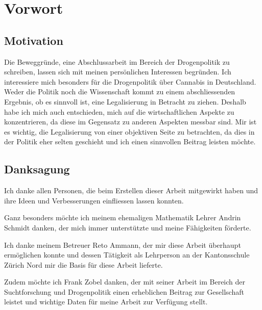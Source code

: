 \documentclass[../main.tex]{subfiles}
\begin{document}
	\section*{Vorwort}	
	
	\subsection*{Motivation}
	Die Beweggründe, eine Abschlussarbeit im Bereich der Drogenpolitik zu schreiben, lassen sich mit meinen persönlichen Interessen begründen.
	Ich interessiere mich besonders für die Drogenpolitik über Cannabis in Deutschland.
	Weder die Politik noch die Wissenschaft kommt zu einem abschliessenden Ergebnis, ob es sinnvoll ist, eine Legalisierung in Betracht zu ziehen.
	Deshalb habe ich mich auch entschieden, mich auf die wirtschaftlichen Aspekte zu konzentrieren, da diese im Gegensatz zu anderen Aspekten messbar sind.
	Mir ist es wichtig, die Legalisierung von einer objektiven Seite zu betrachten, da dies in der Politik eher selten geschieht und ich einen sinnvollen Beitrag leisten möchte. 
	
	
	\subsection*{Danksagung}
	Ich danke allen Personen, die beim Erstellen dieser Arbeit mitgewirkt haben und ihre Ideen und Verbesserungen einfliessen lassen konnten.
	
	\noindent
	Ganz besonders möchte ich meinem ehemaligen Mathematik Lehrer Andrin Schmidt danken, der mich immer unterstützte und meine Fähigkeiten förderte.
	
	\noindent
	Ich danke meinem Betreuer Reto Ammann, der mir diese Arbeit überhaupt ermöglichen konnte und dessen Tätigkeit als Lehrperson an der Kantonsschule Zürich Nord mir die Basis für diese Arbeit lieferte.
	
	\noindent
	Zudem möchte ich Frank Zobel danken, der mit seiner Arbeit im Bereich der Suchtforschung und Drogenpolitik einen erheblichen Beitrag zur Gesellschaft leistet und wichtige Daten für meine Arbeit zur Verfügung stellt.
	
\end{document}
